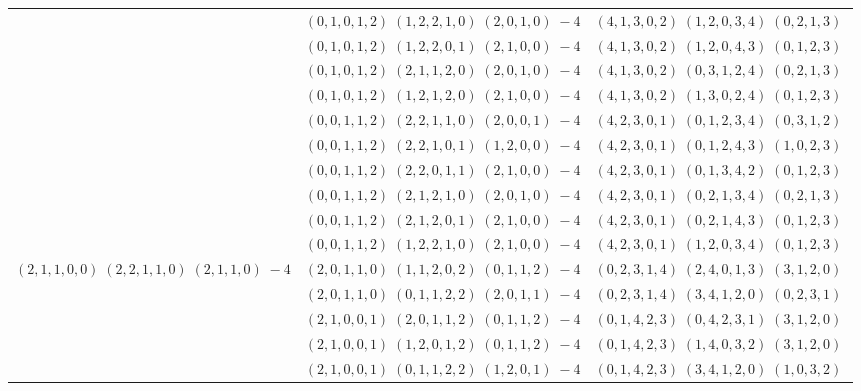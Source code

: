 \documentclass[11pt]{article}
\begin{document}
\begin{longtable}[l]{|c|c|c|}
 \cline{2-3} 
 & $(0 ,1 ,0 ,1 ,2) \;(1 ,2 ,2 ,1 ,0) \;(2 ,0 ,1 ,0) \;-4$ & $(4 ,1 ,3 ,0 ,2) \;(1 ,2 ,0 ,3 ,4) \;(0 ,2 ,1 ,3) \;$\\ 
 \cline{2-3} 
 & $(0 ,1 ,0 ,1 ,2) \;(1 ,2 ,2 ,0 ,1) \;(2 ,1 ,0 ,0) \;-4$ & $(4 ,1 ,3 ,0 ,2) \;(1 ,2 ,0 ,4 ,3) \;(0 ,1 ,2 ,3) \;$\\ 
 \cline{2-3} 
 & $(0 ,1 ,0 ,1 ,2) \;(2 ,1 ,1 ,2 ,0) \;(2 ,0 ,1 ,0) \;-4$ & $(4 ,1 ,3 ,0 ,2) \;(0 ,3 ,1 ,2 ,4) \;(0 ,2 ,1 ,3) \;$\\ 
 \cline{2-3} 
 & $(0 ,1 ,0 ,1 ,2) \;(1 ,2 ,1 ,2 ,0) \;(2 ,1 ,0 ,0) \;-4$ & $(4 ,1 ,3 ,0 ,2) \;(1 ,3 ,0 ,2 ,4) \;(0 ,1 ,2 ,3) \;$\\ 
 \cline{2-3} 
 & $(0 ,0 ,1 ,1 ,2) \;(2 ,2 ,1 ,1 ,0) \;(2 ,0 ,0 ,1) \;-4$ & $(4 ,2 ,3 ,0 ,1) \;(0 ,1 ,2 ,3 ,4) \;(0 ,3 ,1 ,2) \;$\\ 
 \cline{2-3} 
 & $(0 ,0 ,1 ,1 ,2) \;(2 ,2 ,1 ,0 ,1) \;(1 ,2 ,0 ,0) \;-4$ & $(4 ,2 ,3 ,0 ,1) \;(0 ,1 ,2 ,4 ,3) \;(1 ,0 ,2 ,3) \;$\\ 
 \cline{2-3} 
 & $(0 ,0 ,1 ,1 ,2) \;(2 ,2 ,0 ,1 ,1) \;(2 ,1 ,0 ,0) \;-4$ & $(4 ,2 ,3 ,0 ,1) \;(0 ,1 ,3 ,4 ,2) \;(0 ,1 ,2 ,3) \;$\\ 
 \cline{2-3} 
 & $(0 ,0 ,1 ,1 ,2) \;(2 ,1 ,2 ,1 ,0) \;(2 ,0 ,1 ,0) \;-4$ & $(4 ,2 ,3 ,0 ,1) \;(0 ,2 ,1 ,3 ,4) \;(0 ,2 ,1 ,3) \;$\\ 
 \cline{2-3} 
 & $(0 ,0 ,1 ,1 ,2) \;(2 ,1 ,2 ,0 ,1) \;(2 ,1 ,0 ,0) \;-4$ & $(4 ,2 ,3 ,0 ,1) \;(0 ,2 ,1 ,4 ,3) \;(0 ,1 ,2 ,3) \;$\\ 
 \cline{2-3} 
 & $(0 ,0 ,1 ,1 ,2) \;(1 ,2 ,2 ,1 ,0) \;(2 ,1 ,0 ,0) \;-4$ & $(4 ,2 ,3 ,0 ,1) \;(1 ,2 ,0 ,3 ,4) \;(0 ,1 ,2 ,3) \;$\\ \hline\multirow[t]{35}{*}{ $(2 ,1 ,1 ,0 ,0) \;(2 ,2 ,1 ,1 ,0) \;(2 ,1 ,1 ,0) \;-4$ }  & $(2 ,0 ,1 ,1 ,0) \;(1 ,1 ,2 ,0 ,2) \;(0 ,1 ,1 ,2) \;-4$ & $(0 ,2 ,3 ,1 ,4) \;(2 ,4 ,0 ,1 ,3) \;(3 ,1 ,2 ,0) \;$\\ 
 \cline{2-3} 
 & $(2 ,0 ,1 ,1 ,0) \;(0 ,1 ,1 ,2 ,2) \;(2 ,0 ,1 ,1) \;-4$ & $(0 ,2 ,3 ,1 ,4) \;(3 ,4 ,1 ,2 ,0) \;(0 ,2 ,3 ,1) \;$\\ 
 \cline{2-3} 
 & $(2 ,1 ,0 ,0 ,1) \;(2 ,0 ,1 ,1 ,2) \;(0 ,1 ,1 ,2) \;-4$ & $(0 ,1 ,4 ,2 ,3) \;(0 ,4 ,2 ,3 ,1) \;(3 ,1 ,2 ,0) \;$\\ 
 \cline{2-3} 
 & $(2 ,1 ,0 ,0 ,1) \;(1 ,2 ,0 ,1 ,2) \;(0 ,1 ,1 ,2) \;-4$ & $(0 ,1 ,4 ,2 ,3) \;(1 ,4 ,0 ,3 ,2) \;(3 ,1 ,2 ,0) \;$\\ 
 \cline{2-3} 
 & $(2 ,1 ,0 ,0 ,1) \;(0 ,1 ,1 ,2 ,2) \;(1 ,2 ,0 ,1) \;-4$ & $(0 ,1 ,4 ,2 ,3) \;(3 ,4 ,1 ,2 ,0) \;(1 ,0 ,3 ,2) \;$\\ 

\end{longtable}
\end{document}
